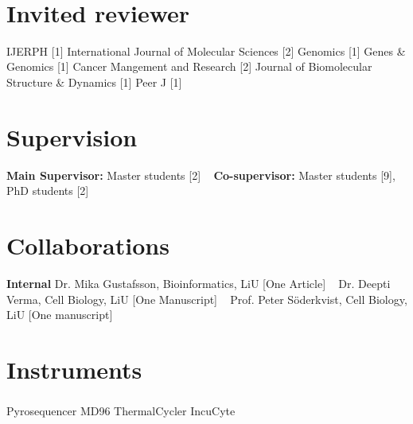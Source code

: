 \documentclass[]{friggeri-cv}
\begin{document}
\begin{aside}
~
~
~
~
  \section{Invited reviewer}
	IJERPH [1]
	International Journal of Molecular Sciences [2]
	Genomics [1]
	Genes \& Genomics [1]
	Cancer Mangement and Research [2]
	Journal of Biomolecular Structure \& Dynamics [1]
	Peer J [1]
 ~
  \section{Supervision}
  \textbf{Main Supervisor:} Master students [2]
  ~
  \textbf{Co-supervisor:} Master students [9], PhD students [2]
 ~ 
\section{Collaborations}
\textbf{Internal}
	Dr. Mika Gustafsson, Bioinformatics, LiU [One Article]
	~
	Dr. Deepti Verma, Cell Biology, LiU [One Manuscript]
	~
	Prof. Peter Söderkvist, Cell Biology, LiU [One manuscript]
~
  \section{Instruments}
  Pyrosequencer MD96
  ThermalCycler
  IncuCyte\textsuperscript{\textregistered}
~  
\end{aside}

\newpage
\end{document}
